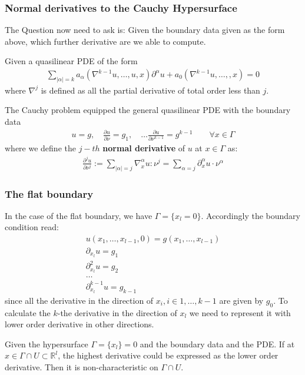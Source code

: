 \subsubsection{Normal derivatives to the Cauchy Hypersurface}
The Question now need to ask is: Given the boundary data given as the form above, which further derivative are we able to compute. \par 
Given a quasilinear PDE of the form
\begin{align*}
	\sum_{|\alpha| = k} a_\alpha(\nabla^{k -1}u, \dots, u, x) \partial^\alpha u + a_0(\nabla^{k -1} u, \dots, , x)  = 0
\end{align*}
where $\nabla^j$ is defined as all the partial derivative of total order less than $j$.\par 
The Cauchy problem equipped the general quasilinear PDE with the boundary data
\begin{align*}
	u = g, \quad \frac{\partial u}{\partial \nu} = g_1, \quad \dots \frac{\partial u}{\partial \nu^{k-1}} = g^{k -1} \qquad \forall x \in \Gamma
\end{align*}
where we define the $j-th$ \textbf{normal derivative} of $u$ at $x \in \Gamma$ as:
\begin{align*}
	\frac{\partial^j u}{\partial \nu^j}:= \sum_{|\alpha| = j} \nabla^\alpha_x u : \nu^j = \sum_{\alpha = j} \partial_x^\alpha u \cdot  \nu^\alpha
\end{align*}

\subsubsection{The flat boundary}
In the case of the flat boundary, we have $\Gamma = \{ x_l = 0\}$. Accordingly the boundary condition read:
\begin{align*}
	u(x_1, \dots, x_{l-1}, 0) = g(x_1, \dots, x_{l-1})\\
	\partial_{x_l} u = g_1\\
	\partial^2_{x_l} u = g_2\\
	\dots\\
	\partial^{k-1}_{x_l} u = g_{k-1}
\end{align*}
since all the derivative in the direction of $x_i, i \in {1, \dots, k-1}$ are given by $g_0$. To calculate the $k$-the derivative in the direction of $x_l$ we need to represent it with lower order derivative in other directions. 


\begin{definition}
	Given the hypersurface $\Gamma = \{ x_l \} = 0$ and the boundary data and the PDE. If at $x \in \Gamma \cap U \subset \mathbb{R}^l$, the highest derivative could be expressed as the lower order derivative. Then it is non-characteristic on $\Gamma \cap U$.  
\end{definition}





